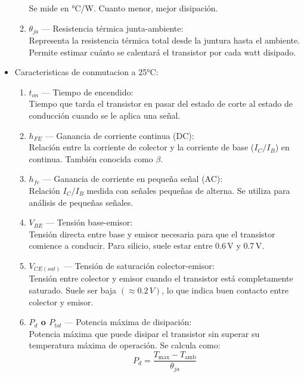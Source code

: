 \begin{itemize}
\begin{enumerate}
              Se mide en °C/W. Cuanto menor, mejor disipación.
        \item \textbf{$\theta_{ja}$} — Resistencia térmica junta-ambiente: \\
        Representa la resistencia térmica total desde la juntura hasta el ambiente. Permite estimar cuánto se calentará
              el transistor por cada watt disipado.
      \end{enumerate}
    \item Caracteristicas de conmutacion a 25°C:
      \begin{enumerate}
        \item \textbf{$t_{on}$} — Tiempo de encendido: \\
        Tiempo que tarda el transistor en pasar del estado de corte al estado de conducción cuando se le aplica una
              señal.
        \item \textbf{$h_{FE}$} — Ganancia de corriente continua (DC): \\
        Relación entre la corriente de colector y la corriente de base ($I_C / I_B$) en continua. También conocida como
              $\beta$.
        \item \textbf{$h_{fe}$} — Ganancia de corriente en pequeña señal (AC): \\
        Relación $I_C / I_B$ medida con señales pequeñas de alterna. Se utiliza para análisis de pequeñas señales.
        \item \textbf{$V_{BE}$} — Tensión base-emisor: \\
        Tensión directa entre base y emisor necesaria para que el transistor comience a conducir. Para silicio, suele
              estar entre 0.6\,V y 0.7\,V.
        \item \textbf{$V_{CE(sat)}$} — Tensión de saturación colector-emisor: \\
        Tensión entre colector y emisor cuando el transistor está completamente saturado. Suele ser baja $(\approx 0.2\,V)$,
              lo que indica buen contacto entre colector y emisor.
        \item \textbf{$P_d$ o $P_{tot}$} — Potencia máxima de disipación: \\
        Potencia máxima que puede disipar el transistor sin superar su temperatura máxima de operación. Se calcula como:
        \[
        P_{d} = \frac{T_{\text{max}} - T_{\text{amb}}}{\theta_{ja}}
        \]
      \end{enumerate}
  \end{itemize}


